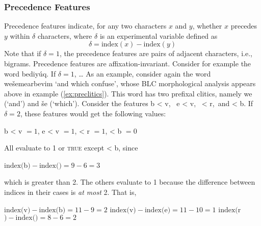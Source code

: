 \subsubsection{Precedence Features}
Precedence features indicate, for any two characters $x$ and $y$,
whether $x$ precedes $y$ within $\delta$ characters,
where $\delta$ is an experimental variable defined as
	\begin{equation}\label{eq:indexdif}
	\delta = \text{index}(x) - \text{index}(y)
	\end{equation}
Note that if $\delta = 1$, the precedence features are pairs of adjacent 
characters, i.e., bigrams.
Precedence features are affixation-invariant. 
Consider for example 
the word \textsf{bediy\'uq}. If $\delta = 1$, \dots 
As an example, consider again the word \textsf{we\v{s}emearbevim} `and which confuse', whose \ac{BLC} morphological 
analysis appears above in example (\ref{ex:preclitics}). This word has two prefixal clitics, namely \textsf{we} 
(`and') and \textsf{\v{s}e} (`which'). %
Consider the features \textsf{b < v}, \, \textsf{e < v}, \,\textsf{ < r},\, and \textsf{ < b}. If $\delta=2$, these features would get the 
following values: 
\begin{exe}	
	\ex \textsf{b < v} $ =1 $, \qquad \textsf{e < v} $ =1 $, \qquad\textsf{ < r} $ =1$, \qquad \textsf{< b} $=0$
\end{exe}

All evaluate to 1 or \textsc{true} except \textsf{ < b}, since
\begin{exe}
	\ex $\text{index}($\textsf{b}$) - \text{index}($\textsf{\textrevglotstop}$) = 9 - 6 = 3$
\end{exe}
which is greater than 2.
The others evaluate to 1 because the difference between indices in their cases is \emph{at most} 2. That is,
\begin{exe}
    \ex \begin{xlist}
	\ex $\text{index}($\textsf{v}$) - \text{index}($\textsf{b}$) = 11 - 9 = 2$ 
	\ex $\text{index}($\textsf{v}$) - \text{index}($\textsf{e}$) = 11 - 10 = 1$ 
	\ex $\text{index}($\textsf{r}$) - \text{index}($\textsf{\textrevglotstop}$) = 8 - 6 = 2 $
    \end{xlist}
\end{exe}

